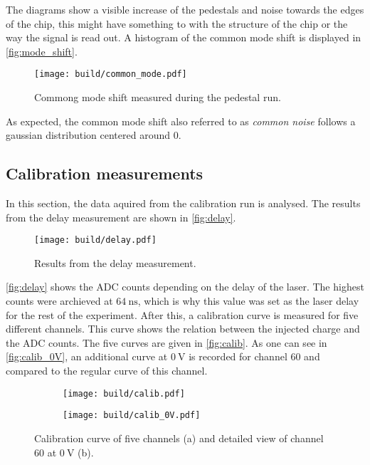 The diagrams show a visible increase of the pedestals and noise towards the edges of the chip,
this might have something to with the structure of the chip or the way the signal is read out.
A histogram of the common mode shift is displayed in \autoref{fig:mode_shift}.

\begin{figure}[H]
  \centering
  \texttt{[image: build/common\_mode.pdf]}
  \caption{Commong mode shift measured during the pedestal run.}
  \label{fig:mode_shift}
\end{figure}

As expected, the common mode shift also referred to as \textit{common noise} follows a gaussian
distribution centered around $0$.

\subsection{Calibration measurements}

In this section, the data aquired from the calibration run is analysed. The results from the delay measurement
are shown in \autoref{fig:delay}.

\begin{figure}[H]
  \centering
  \texttt{[image: build/delay.pdf]}
  \caption{Results from the delay measurement.}
  \label{fig:delay}
\end{figure}

\autoref{fig:delay} shows the ADC counts depending on the delay of the laser. The highest
counts were archieved at $\qty{64}{\nano\second}$, which is why this value was set as the
laser delay for the rest of the experiment.
After this, a calibration curve is measured for five different channels. This curve shows
the relation between the injected charge and the ADC counts. The five curves are given
in \autoref{fig:calib}.
As one can see in \autoref{fig:calib_0V}, an additional curve at $\qty{0}{\volt}$ is recorded for channel $60$
and compared to the regular curve of this channel.

\begin{figure}[H]
  \centering
    \begin{subfigure}{0.45\textwidth}
      \texttt{[image: build/calib.pdf]}
      \caption{}
      \label{fig:calib}
    \end{subfigure}
    \begin{subfigure}{0.45\textwidth}
      \texttt{[image: build/calib\_0V.pdf]}
      \caption{}
      \label{fig:calib_0V}
    \end{subfigure} 
  \caption{Calibration curve of five channels (a) and detailed view of channel $60$ at $\qty{0}{\volt}$ (b).}
  \label{fig:calib_run}
\end{figure}

